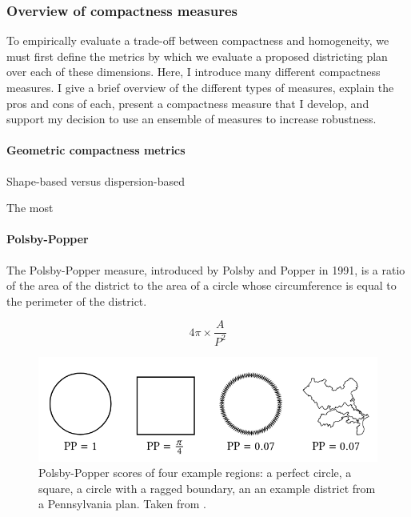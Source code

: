 \documentclass[]{article}
\let\oldparagraph\paragraph
\renewcommand{\paragraph}[1]{\oldparagraph{#1}\mbox{}}
\begin{document}
\hypertarget{overview-of-compactness-measures}{%
\subsubsection{Overview of compactness
measures}\label{overview-of-compactness-measures}}

To empirically evaluate a trade-off between compactness and homogeneity,
we must first define the metrics by which we evaluate a proposed
districting plan over each of these dimensions. Here, I introduce many
different compactness measures. I give a brief overview of the different
types of measures, explain the pros and cons of each, present a
compactness measure that I develop, and support my decision to use an
ensemble of measures to increase robustness.

\hypertarget{geometric-compactness-metrics}{%
\paragraph{Geometric compactness
metrics}\label{geometric-compactness-metrics}}

Shape-based versus dispersion-based

The most

\hypertarget{polsby-popper}{%
\paragraph{Polsby-Popper}\label{polsby-popper}}

The Polsby-Popper measure, introduced by Polsby and Popper in 1991, is a
ratio of the area of the district to the area of a circle whose
circumference is equal to the perimeter of the district.

\[4\pi \times \frac{A}{P^2}\]

\begin{figure}
\centering
\includegraphics{img/pp_example.png}
\caption{Polsby-Popper scores of four example regions: a perfect circle,
a square, a circle with a ragged boundary, an an example district from a
Pennsylvania plan. Taken from \cite{s2020}.}
\end{figure}
\end{document}
